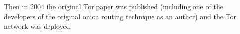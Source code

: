 %
%	
%	
%		
%		
%	
%	
%	
%	
%	
%	
%	
%	
%	
%	
%	
%	
%	
	
Then in 2004 the original Tor paper was published \cite{tor2004original} (including one of the developers of the original onion routing technique as an author) and the Tor network was deployed.